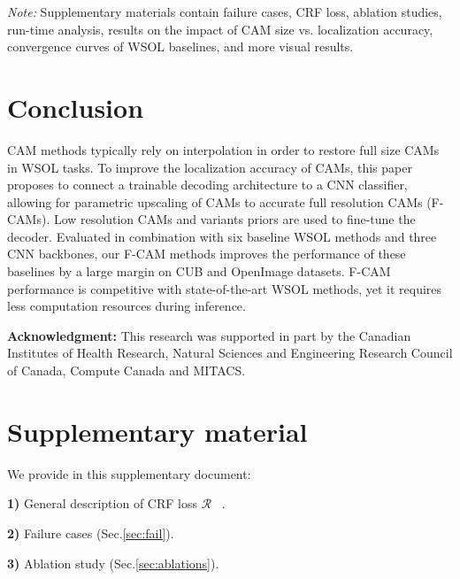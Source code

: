\documentclass[twocolumn]{article}
\theoremstyle{definition}
\begin{document}
\noindent \emph{Note:} Supplementary materials contain failure cases, CRF loss, ablation studies, run-time analysis, results on the impact of CAM size vs. localization accuracy, convergence curves of WSOL baselines, and more visual results.


\section{Conclusion}
\label{sec:conclusion}
CAM methods typically rely on interpolation in order to restore full size CAMs in WSOL tasks. To improve the localization accuracy of CAMs, this paper proposes to connect a trainable decoding architecture to a CNN classifier, allowing for parametric upscaling of CAMs to accurate full resolution CAMs (F-CAMs). Low resolution CAMs and variants priors are used to fine-tune the decoder. Evaluated in combination with six baseline WSOL methods and three CNN backbones, our F-CAM methods improves the performance of these baselines by a large margin on CUB and OpenImage datasets.  F-CAM performance is competitive with state-of-the-art WSOL methods, yet it requires less computation resources during inference.


\noindent \textbf{Acknowledgment:} This research was supported in part by the Canadian Institutes of Health Research, Natural Sciences and Engineering Research Council of Canada, Compute Canada and MITACS.

\FloatBarrier

\renewcommand{\theequation}{\thesection.\arabic{equation}}
\setcounter{equation}{0}

\renewcommand\thefigure{\thesection.\arabic{figure}}
\setcounter{figure}{0}

\renewcommand\thetable{\thesection.\arabic{table}}
\setcounter{table}{0}

\appendices





\section{Supplementary material}


We provide in this supplementary document:


\noindent \textbf{1)} General description of CRF loss ${\mathcal{R}}$ ~\cite{tang2018regularized}.

\noindent \textbf{2)} Failure cases (Sec.\ref{sec:fail}).

\noindent \textbf{3)} Ablation study (Sec.\ref{sec:ablations}).
\end{document}
